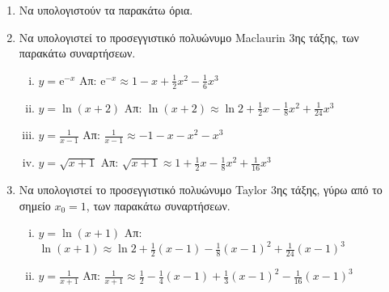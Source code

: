 \begin{enumerate}
  \item Να υπολογιστούν τα παρακάτω όρια.
    \begin{enumerate}[(i)]
  \end{enumerate}

\item Να υπολογιστεί το προσεγγιστικό πολυώνυμο Maclaurin 3ης τάξης, των παρακάτω συναρτήσεων.
  \begin{enumerate}[i)]
    \item $ y= \mathrm{e}^{-x} $ 
      \hfill Απ: $ \mathrm{e}^{-x} \approx 1-x+ \frac{1}{2} x^{2} - \frac{1}{6} x^{3} $ 
    \item $ y= \ln{(x+2)} $ 
      \hfill Απ: $ \ln{(x+2)} \approx \ln{2} + \frac{1}{2} x - \frac{1}{8} x^{2} +
      \frac{1}{24} x^{3} $ 
    \item $ y= \frac{1}{x-1} $ \hfill Απ: $ \frac{1}{x-1} \approx -1 -x -x^{2} - x^{3} $ 
    \item $ y= \sqrt{x+1} $ \hfill Απ: $ \sqrt{x+1} \approx 1 + \frac{1}{2} x -
      \frac{1}{8} x^{2} + \frac{1}{16} x^{3} $ 
  \end{enumerate}

\item Να υπολογιστεί το προσεγγιστικό πολυώνυμο Taylor 3ης τάξης, γύρω από 
  το σημείο $ x_{0}=1 $, των παρακάτω συναρτήσεων.
  \begin{enumerate}[i)]
    \item $ y= \ln{(x+1)} $ 
      \hfill Απ: $ \ln{(x+1)} \approx \ln{2} + \frac{1}{2} (x-1) - \frac{1}{8}
      (x-1)^{2} + \frac{1}{24} (x-1)^{3} $ 
    \item $ y= \frac{1}{x+1} $ \hfill Απ: $ \frac{1}{x+1} \approx \frac{1}{2} -
      \frac{1}{4} (x-1) + \frac{1}{3} (x-1)^{2} - \frac{1}{16} (x-1)^{3} $ 
  \end{enumerate}
\end{enumerate}





